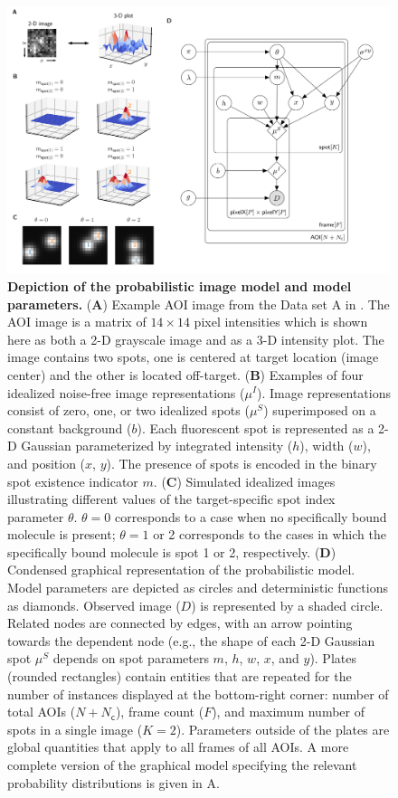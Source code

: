 \begin{figure}
\begin{fullwidth}
\includegraphics[width=183mm]{figures/graphical_model.png}
\caption{\textbf{Depiction of the probabilistic image model and model parameters.} (\textbf{A}) Example AOI image from the Data set A in . The AOI image is a matrix of $14 \times 14$ pixel intensities which is shown here as both a 2-D grayscale image and as a 3-D intensity plot. The image contains two spots, one is centered at target location (image center) and the other is located off-target. (\textbf{B}) Examples of four idealized noise-free image representations ($\mu^I$). Image representations consist of zero, one, or two idealized spots ($\mu^S$) superimposed on a constant background ($b$). Each fluorescent spot is represented as a 2-D Gaussian parameterized by integrated intensity ($h$), width ($w$), and position ($x$, $y$). The presence of spots is encoded in the binary spot existence indicator $m$. (\textbf{C}) Simulated idealized images illustrating different values of the target-specific spot index parameter $\theta$. $\theta = 0$ corresponds to a case when no specifically bound molecule is present; $\theta = 1$ or 2 corresponds to the cases in which the specifically bound molecule is spot 1 or 2, respectively. (\textbf{D}) Condensed graphical representation of the probabilistic model. Model parameters are depicted as circles and deterministic functions as diamonds. Observed image ($D$) is represented by a shaded circle. Related nodes are connected by edges, with an arrow pointing towards the dependent node (e.g., the shape of each 2-D Gaussian spot $\mu^S$ depends on spot parameters $m$, $h$, $w$, $x$, and $y$). Plates (rounded rectangles) contain entities that are repeated for the number of instances displayed at the bottom-right corner: number of total AOIs ($N+N_\mathsf{c}$), frame count ($F$), and maximum number of spots in a single image ($K=2$). Parameters outside of the plates are global quantities that apply to all frames of all AOIs. A more complete version of the graphical model specifying the relevant probability distributions is given in A. }

\end{fullwidth}
\end{figure}

